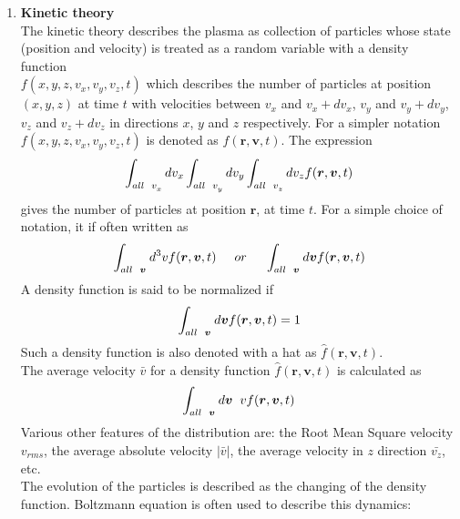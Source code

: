 \documentclass[12pt]{article}
\begin{document}
\begin{enumerate}
		\item \textbf{Kinetic theory} \\
		The kinetic theory describes the plasma as collection of particles whose state (position and velocity) is treated as a random variable with a density function \\ $ f(x, y, z, v_{x}, v_{y}, v_{z}, t) $ which describes the number of particles at position $ (x, y, z) $ at time $ t $ with velocities between $ v_{x} $ and $ v_{x} + dv_{x} $, $ v_{y} $ and $ v_{y} + dv_{y} $, $ v_{z} $ and $ v_{z} + dv_{z} $ in directions $x$, $y$ and $z$ respectively. For a simpler notation $ f(x, y, z, v_{x}, v_{y}, v_{z}, t) $ is denoted as $ f(\boldsymbol{r}, \boldsymbol{v}, t) $.
		The expression $$\displaystyle \int_{all \hspace{0.2cm} v_{x}^{}} dv_{x} \int_{all \hspace{0.2cm} v_{y}^{}} dv_{y} \int_{all \hspace{0.2cm} v_{z}^{}} dv_{z} f(\boldsymbol{r}, \boldsymbol{v}, t) $$ gives the number of particles at position $\boldsymbol{r}$, at time $t$.  For a simple choice of notation, it if often written as $$\displaystyle \int_{all \hspace{0.2cm} \boldsymbol{v}^{}} d^{3}v f(\boldsymbol{r}, \boldsymbol{v}, t) \hspace{0.5cm}\mathnormal{or} \hspace{0.5cm}\int_{all \hspace{0.2cm} \boldsymbol{v}^{}} d\boldsymbol{v} f(\boldsymbol{r}, \boldsymbol{v}, t)$$ A density function is said to be normalized if $$\displaystyle \int_{all \hspace{0.2cm} \boldsymbol{v}^{}} d\boldsymbol{v} f(\boldsymbol{r}, \boldsymbol{v}, t) = 1$$ Such a density function is also denoted with a hat as $ \hat{f}(\boldsymbol{r}, \boldsymbol{v}, t) $.\\
		\noindent The average velocity $\bar{v}$ for a density function $ \hat{f}(\boldsymbol{r}, \boldsymbol{v}, t) $ is calculated as  $$\displaystyle \int_{all \hspace{0.2cm} \boldsymbol{v}^{}} d\boldsymbol{v} \hspace{0.2cm} v f(\boldsymbol{r}, \boldsymbol{v}, t)$$ Various other features of the distribution are: the Root Mean Square velocity $v_{rms}$, the average absolute velocity $|\bar{v}|$, the average velocity in $z$ direction $\bar{v_{z}}$, etc.\\
		The evolution of the particles is described as the changing of the density function. Boltzmann equation is often used to describe this dynamics:
		

\end{enumerate}
\end{document}
